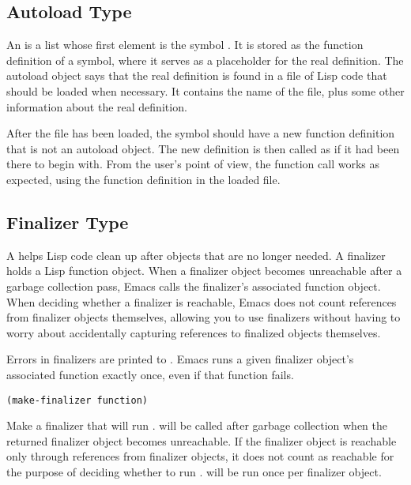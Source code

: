 \subsection{Autoload Type}
\label{sec:autoload-type}

An  is a list whose first element is the symbol .
It is stored as the function definition of a symbol, where it serves as a placeholder for the real definition.
The autoload object says that the real definition is found in a file of Lisp code that should be loaded when necessary.
It contains the name of the file, plus some other information about the real definition.


After the file has been loaded, the symbol should have a new function definition that is not an autoload object.
The new definition is then called as if it had been there to begin with.
From the user’s point of view, the function call works as expected, using the function definition in the loaded file.


\subsection{Finalizer Type}
\label{sec:finalizer-type}

A  helps Lisp code clean up after objects that are no longer needed.
A finalizer holds a Lisp function object.
When a finalizer object becomes unreachable after a garbage collection pass, Emacs calls the finalizer’s associated function object.
When deciding whether a finalizer is reachable, Emacs does not count references from finalizer objects themselves, allowing you to use finalizers without having to worry about accidentally capturing references to finalized objects themselves.


Errors in finalizers are printed to .
Emacs runs a given finalizer object’s associated function exactly once, even if that function fails.


\begin{lstlisting}
(make-finalizer function)
\end{lstlisting}
Make a finalizer that will run .
 will be called after garbage collection when the returned finalizer object becomes unreachable.
If the finalizer object is reachable only through references from finalizer objects, it does not count as reachable for the purpose of deciding whether to run .
 will be run once per finalizer object.




